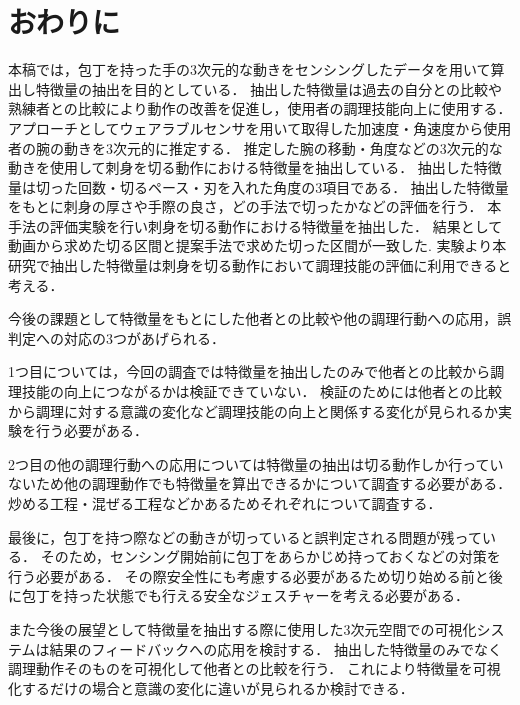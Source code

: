 \section{おわりに}

本稿では，包丁を持った手の3次元的な動きをセンシングしたデータを用いて算出し特徴量の抽出を目的としている．
抽出した特徴量は過去の自分との比較や熟練者との比較により動作の改善を促進し，使用者の調理技能向上に使用する．
アプローチとしてウェアラブルセンサを用いて取得した加速度・角速度から使用者の腕の動きを3次元的に推定する．
推定した腕の移動・角度などの3次元的な動きを使用して刺身を切る動作における特徴量を抽出している．
抽出した特徴量は切った回数・切るペース・刃を入れた角度の3項目である．
抽出した特徴量をもとに刺身の厚さや手際の良さ，どの手法で切ったかなどの評価を行う．
本手法の評価実験を行い刺身を切る動作における特徴量を抽出した．
結果として動画から求めた切る区間と提案手法で求めた切った区間が一致した.
実験より本研究で抽出した特徴量は刺身を切る動作において調理技能の評価に利用できると考える．

今後の課題として特徴量をもとにした他者との比較や他の調理行動への応用，誤判定への対応の3つがあげられる．

1つ目については，今回の調査では特徴量を抽出したのみで他者との比較から調理技能の向上につながるかは検証できていない．
検証のためには他者との比較から調理に対する意識の変化など調理技能の向上と関係する変化が見られるか実験を行う必要がある．

2つ目の他の調理行動への応用については特徴量の抽出は切る動作しか行っていないため他の調理動作でも特徴量を算出できるかについて調査する必要がある．
炒める工程・混ぜる工程などかあるためそれぞれについて調査する．

最後に，包丁を持つ際などの動きが切っていると誤判定される問題が残っている．
そのため，センシング開始前に包丁をあらかじめ持っておくなどの対策を行う必要がある．
その際安全性にも考慮する必要があるため切り始める前と後に包丁を持った状態でも行える安全なジェスチャーを考える必要がある．

また今後の展望として特徴量を抽出する際に使用した3次元空間での可視化システムは結果のフィードバックへの応用を検討する．
抽出した特徴量のみでなく調理動作そのものを可視化して他者との比較を行う．
これにより特徴量を可視化するだけの場合と意識の変化に違いが見られるか検討できる．